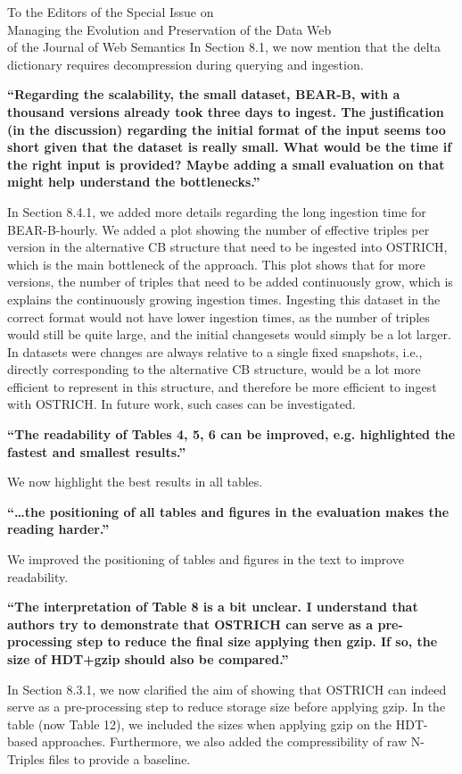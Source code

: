 \documentclass{letter}
\begin{document}
\begin{letter}{To the Editors of the Special Issue on\\Managing the Evolution and Preservation of the Data Web\\of the Journal of Web Semantics}
In Section 8.1, we now mention that the delta dictionary requires decompression during querying and ingestion.

\textbf{\enquote{Regarding the scalability, the small dataset, BEAR-B, with a thousand versions already took three days to ingest. The justification (in the discussion) regarding the initial format of the input seems too short given that the dataset is really small. What would be the time if the right input is provided? Maybe adding a small evaluation on that might help understand the bottlenecks.}}

In Section 8.4.1, we added more details regarding the long ingestion time for BEAR-B-hourly.
We added a plot showing the number of effective triples per version in the alternative CB structure that need to be ingested into OSTRICH,
which is the main bottleneck of the approach.
This plot shows that for more versions, the number of triples that need to be added continuously grow,
which is explains the continuously growing ingestion times.
Ingesting this dataset in the correct format would not have lower ingestion times,
as the number of triples would still be quite large, and the initial changesets would simply be a lot larger.
In datasets were changes are always relative to a single fixed snapshots, i.e., directly corresponding to the alternative CB structure,
would be a lot more efficient to represent in this structure, and therefore be more efficient to ingest with OSTRICH.
In future work, such cases can be investigated.

\textbf{\enquote{The readability of Tables 4, 5, 6 can be improved, e.g. highlighted the fastest and smallest results.}}

We now highlight the best results in all tables.

\textbf{\enquote{\ldots the positioning of all tables and figures in the evaluation makes the reading harder.}}

We improved the positioning of tables and figures in the text to improve readability.

\textbf{\enquote{The interpretation of Table 8 is a bit unclear. I understand that authors try to demonstrate that OSTRICH can serve as a pre-processing step to reduce the final size applying then gzip. If so, the size of HDT+gzip should also be compared.}}

In Section 8.3.1, we now clarified the aim of showing that OSTRICH can indeed serve as a pre-processing step to reduce storage size before applying gzip.
In the table (now Table 12), we included the sizes when applying gzip on the HDT-based approaches.
Furthermore, we also added the compressibility of raw N-Triples files to provide a baseline.

\end{letter}
\end{document}
